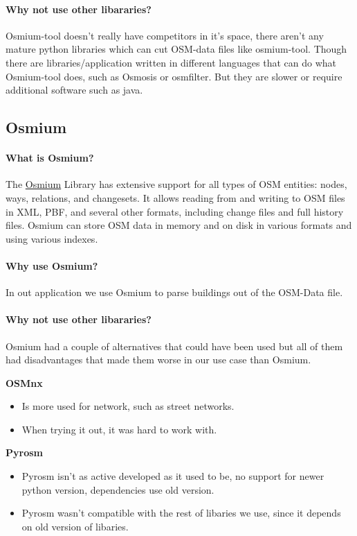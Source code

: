 \documentclass[letterpaper,10pt,english]{sphinxmanual}
\begin{document}
\paragraph{Why not use other libararies?}
Osmium-tool doesn't really have competitors in it's space, there aren't any mature python libraries which can cut OSM-data files like osmium-tool.
Though there are libraries/application written in different languages that can do what Osmium-tool does, such as Osmosis or osmfilter.
But they are slower or require additional software such as java.


\subsection{Osmium}

\paragraph{What is Osmium?}
The \href{https://osmcode.org/libosmium/}{Osmium} Library has extensive support for all types of OSM entities: nodes, ways, relations, and changesets. It allows reading from and writing to OSM files in XML, PBF, and several other formats, including change files and full history files. Osmium can store OSM data in memory and on disk in various formats and using various indexes.

\paragraph{Why use Osmium?}
In out application we use Osmium to parse buildings out of the OSM-Data file.

\paragraph{Why not use other libararies?}
Osmium had a couple of alternatives that could have been used but all of them had disadvantages that made them worse in our use case than Osmium. 
  
\textbf{OSMnx}
\begin{itemize}
    \item Is more used for network, such as street networks. 
    \item When trying it out, it was hard to work with.
\end{itemize}


\textbf{Pyrosm}
\begin{itemize}
    \item Pyrosm isn't as active developed as it used to be, no support for newer python version, dependencies use old version.
    \item Pyrosm wasn't compatible with the rest of libaries we use, since it depends on old version of libaries.
\end{itemize}
\end{document}

